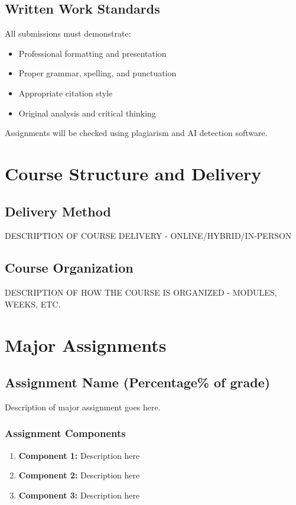 \documentclass[12pt]{article}
\begin{document}
\subsection*{Written Work Standards}
All submissions must demonstrate:
\begin{itemize}
\item Professional formatting and presentation
\item Proper grammar, spelling, and punctuation
\item Appropriate citation style
\item Original analysis and critical thinking
\end{itemize}

Assignments will be checked using plagiarism and AI detection software.

\section*{Course Structure and Delivery}

\subsection*{Delivery Method}
DESCRIPTION OF COURSE DELIVERY - ONLINE/HYBRID/IN-PERSON

\subsection*{Course Organization}
DESCRIPTION OF HOW THE COURSE IS ORGANIZED - MODULES, WEEKS, ETC.

\section*{Major Assignments}

\subsection*{Assignment Name (Percentage\% of grade)}
Description of major assignment goes here.

\subsubsection*{Assignment Components}
\begin{enumerate}
\item \textbf{Component 1:} Description here
\item \textbf{Component 2:} Description here  
\item \textbf{Component 3:} Description here
\end{enumerate}
\end{document}
